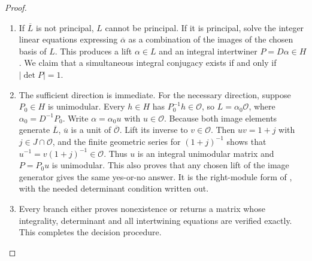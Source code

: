 \documentclass[11pt,a4paper]{article}
\theoremstyle{definition}
\begin{document}
\begin{proof}
\begin{enumerate}[label=\arabic*.]
\item If $\overline L$ is not principal, $L$ cannot be principal. If it is
principal, solve the integer linear equations expressing
$\overline\alpha$ as a combination of the images of the chosen basis
of $L$. This produces a lift $\alpha\in L$ and an integral
intertwiner $P=D\alpha\in H$. We claim that a simultaneous integral
conjugacy exists if and only if $|\det P|=1$.

\item The sufficient direction is immediate. For the necessary direction,
suppose $P_0\in H$ is unimodular. Every $h\in H$ has
$P_0^{-1}h\in\mathcal O$, so
$L=\alpha_0\mathcal O$, where $\alpha_0=D^{-1}P_0$.
Write $\alpha=\alpha_0u$ with $u\in\mathcal O$.
Because both image elements generate $\overline L$,
$\overline u$ is a unit of $\overline{\mathcal O}$.
Lift its inverse to $v\in\mathcal O$. Then $uv=1+j$ with
$j\in J\cap\mathcal O$, and the finite geometric series for
$(1+j)^{-1}$ shows that $u^{-1}=v(1+j)^{-1}\in\mathcal O$.
Thus $u$ is an integral unimodular matrix and
$P=P_0u$ is unimodular. This also proves that any chosen lift of the
image generator gives the same yes-or-no answer. It is the
right-module form of \cite[Theorem 3.4, p.~6; Propositions 8.1--8.2, p.~21]{rootBHJ22},
with the needed determinant condition written out.

\item Every branch either proves nonexistence or returns a matrix whose
integrality, determinant and all intertwining equations are verified
exactly. This completes the decision procedure.

\end{enumerate}
\end{proof}
\end{document}
